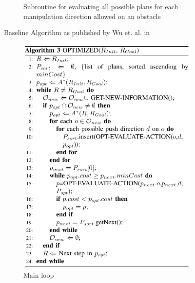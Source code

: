 \begin{figure}[H]
\begin{subfigure}{.5\textwidth}
  \caption{Subroutine for evaluating all possible plans for each manipulation direction allowed on an obstacle}
  \label{fig:Wu_Original_Algorithm-algo2}
\end{subfigure}
\caption{Baseline Algorithm as published by Wu et. al. in \parencite{wu_navigation_2010}}
\label{fig:Wu_Original_Algorithm-baseline}
\end{figure}

\begin{figure}[H]
\centering
\begin{subfigure}{.5\textwidth}
  \centering
  \includegraphics[width=\linewidth]{Figures/Wu_Original_Algorithm/algo3.png}
  \caption{Main loop}
  \label{fig:Wu_Original_Algorithm-algo3}
\end{subfigure}%
\begin{subfigure}{.5\textwidth}
  \centering

\end{subfigure}
\end{figure}
